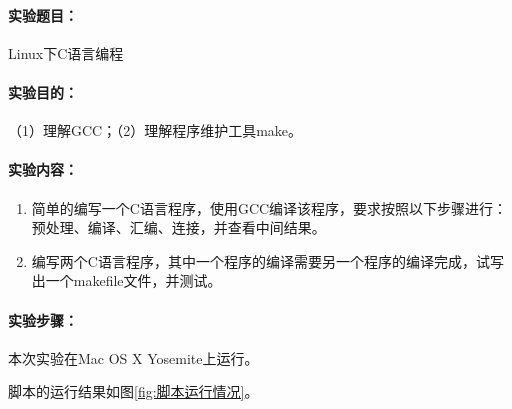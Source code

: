\documentclass[cs4size,a4paper,nofonts]{ctexart}
\def\titlec{Linux下C语言编程}
\begin{document}




\paragraph{实验题目：}\titlec

\paragraph{实验目的：}
（1）理解GCC；（2）理解程序维护工具make。

\paragraph{实验内容：}
\begin{enumerate}
\item 简单的编写一个C语言程序，使用GCC编译该程序，要求按照以下步骤进行：预处理、编译、汇编、连接，并查看中间结果。
\item 编写两个C语言程序，其中一个程序的编译需要另一个程序的编译完成，试写出一个makefile文件，并测试。
\end{enumerate}

\paragraph{实验步骤：}\quad

\newcommand{\image}[3][width=0.9\textwidth]{
    \centering
        \texttt{[image: images/exp9/\#2.png]}
    \caption{#3}
    \label{fig:#3}
}

本次实验在Mac OS X Yosemite上运行。

脚本的运行结果如图\ref{fig:脚本运行情况}。
\end{document}
